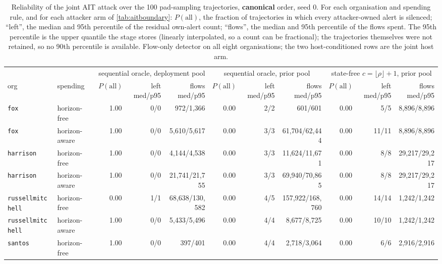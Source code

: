 \begin{table}[t]
\centering
\caption{Reliability of the joint AIT attack over the 100 pad-sampling trajectories,
\textbf{canonical} order, seed 0. For each organisation and spending rule, and for each attacker arm of
\cref{tab:aitboundary}: $P(\text{all})$, the fraction of trajectories in which every attacker-owned
alert is silenced; ``left'', the median and 95th percentile of the residual own-alert count; ``flows'',
the median and 95th percentile of the flows spent. The 95th percentile is the upper quantile the stage
stores (linearly interpolated, so a count can be fractional); the trajectories themselves were not
retained, so no 90th percentile is available. Flow-only
detector on all eight organisations; the two host-conditioned rows are the joint host arm.}
\label{apptab:joint76rel}
\footnotesize
\setlength{\tabcolsep}{2.4pt}
\begin{tabular}{llrrrrrrrrr}
\toprule
& & \multicolumn{3}{c}{sequential oracle, deployment pool} & \multicolumn{3}{c}{sequential oracle, prior pool} & \multicolumn{3}{c}{state-free $c=\lfloor\rho\rfloor+1$, prior pool} \\
\cmidrule(lr){3-5}\cmidrule(lr){6-8}\cmidrule(lr){9-11}
org & spending & $P(\text{all})$ & left med/p95 & flows med/p95 & $P(\text{all})$ & left med/p95 & flows med/p95 & $P(\text{all})$ & left med/p95 & flows med/p95 \\
\midrule
\texttt{fox} & horizon-free & 1.00 & 0/0 & 972/1{,}366 & 0.00 & 2/2 & 601/601 & 0.00 & 5/5 & 8{,}896/8{,}896 \\
\texttt{fox} & horizon-aware & 1.00 & 0/0 & 5{,}610/5{,}617 & 0.00 & 3/3 & 61{,}704/62{,}444 & 0.00 & 11/11 & 8{,}896/8{,}896 \\
\texttt{harrison} & horizon-free & 1.00 & 0/0 & 4{,}144/4{,}538 & 0.00 & 3/3 & 11{,}624/11{,}671 & 0.00 & 8/8 & 29{,}217/29{,}217 \\
\texttt{harrison} & horizon-aware & 1.00 & 0/0 & 21{,}741/21{,}755 & 0.00 & 3/3 & 69{,}940/70{,}865 & 0.00 & 8/8 & 29{,}217/29{,}217 \\
\texttt{russellmitchell} & horizon-free & 0.00 & 1/1 & 68{,}638/130{,}582 & 0.00 & 4/5 & 157{,}922/168{,}760 & 0.00 & 14/14 & 1{,}242/1{,}242 \\
\texttt{russellmitchell} & horizon-aware & 1.00 & 0/0 & 5{,}433/5{,}496 & 0.00 & 4/4 & 8{,}677/8{,}725 & 0.00 & 10/10 & 1{,}242/1{,}242 \\
\texttt{santos} & horizon-free & 1.00 & 0/0 & 397/401 & 0.00 & 4/4 & 2{,}718/3{,}064 & 0.00 & 6/6 & 2{,}916/2{,}916 \\

\end{tabular}
\end{table}

